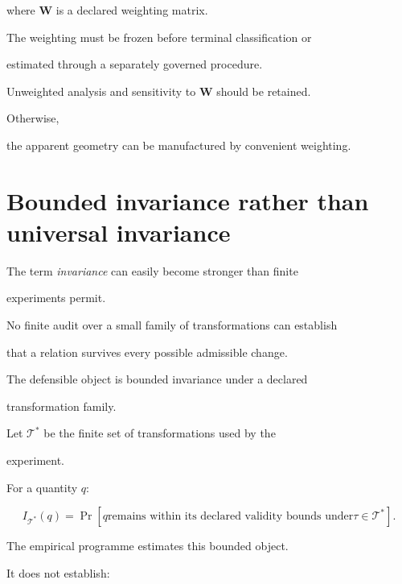 \documentclass[11pt,a4paper,oneside]{report}
\begin{document}
where $\mathbf{W}$ is a declared weighting matrix.



The weighting must be frozen before terminal classification or

estimated through a separately governed procedure.



Unweighted analysis and sensitivity to $\mathbf{W}$ should be retained.



Otherwise,

the apparent geometry can be manufactured by convenient weighting.





\section{Bounded invariance rather than universal invariance}



The term \emph{invariance} can easily become stronger than finite

experiments permit.



No finite audit over a small family of transformations can establish

that a relation survives every possible admissible change.



The defensible object is bounded invariance under a declared

transformation family.



Let $\mathcal{T}^{*}$ be the finite set of transformations used by the

experiment.



For a quantity $q$:



\begin{equation}
\label{eq:bounded-invariance}
I_{\mathcal{T}^{*}}(q)
=
\Pr
\left[
q
\text{remains within its declared validity bounds under}
\tau
\in
\mathcal{T}^{*}
\right].
\end{equation}



The empirical programme estimates this bounded object.



It does not establish:
\end{document}
